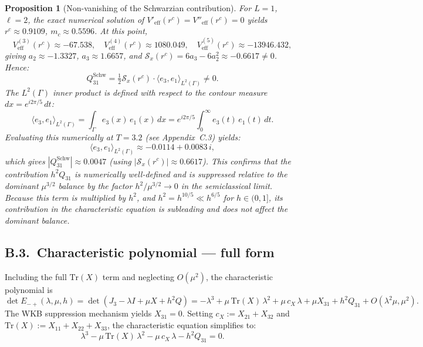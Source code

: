 \documentclass[12pt,a4paper]{amsart}
\newtheorem{proposition}[theorem]{Proposition}
\theoremstyle{remark}
\begin{document}
\begin{proposition}[Non-vanishing of the Schwarzian contribution]
For $L=1$, $\ell=2$, the exact numerical solution of
$V'_{\mathrm{eff}}(r^c) = V''_{\mathrm{eff}}(r^c) = 0$ yields $r^c \approx 0.9109$,
$m_c \approx 0.5596$. At this point,
\[
  V^{(3)}_{\mathrm{eff}}(r^c) \approx -67.538,\quad
  V^{(4)}_{\mathrm{eff}}(r^c) \approx 1080.049,\quad
  V^{(5)}_{\mathrm{eff}}(r^c) \approx -13946.432,
\]
giving $a_2 \approx -1.3327$, $a_3 \approx 1.6657$, and
$\mathcal{S}_x(r^c) = 6a_3 - 6a_2^2 \approx -0.6617 \neq 0$.
Hence:
\[
  Q^{\mathrm{Schw}}_{31} = \tfrac{1}{2}\mathcal{S}_x(r^c)\cdot\langle e_3,e_1\rangle_{L^2(\Gamma)} \neq 0.
\]
The $L^2(\Gamma)$ inner product is defined with respect to the contour measure $dx = e^{i2\pi/5}\,dt$:
\[
  \langle e_3, e_1\rangle_{L^2(\Gamma)}
  = \int_\Gamma e_3(x)\,e_1(x)\,dx
  = e^{i2\pi/5}\int_0^\infty e_3(t)\,e_1(t)\,dt.
\]
Evaluating this numerically at $T=3.2$ (see Appendix~C.3) yields:
\[
  \langle e_3, e_1\rangle_{L^2(\Gamma)} \approx -0.0114 + 0.0083\,i,
\]
which gives $|Q^{\mathrm{Schw}}_{31}| \approx 0.0047$ (using $|\mathcal{S}_x(r^c)|\approx 0.6617$).
This confirms that the contribution $h^2 Q_{31}$ is numerically well-defined and
is suppressed relative to the dominant $\mu^{3/2}$ balance by the factor
$h^2/\mu^{3/2} \to 0$ in the semiclassical limit.
Because this term is multiplied by $h^2$, and $h^2 = h^{10/5} \ll h^{6/5}$
for $h \in (0,1]$, its contribution in the characteristic equation is subleading
and does not affect the dominant balance.
\end{proposition}

\subsection*{B.3.~Characteristic polynomial --- full form}

Including the full $\mathrm{Tr}(X)$ term and neglecting $O(\mu^2)$, the characteristic
polynomial is
\begin{equation}
\label{eq:charpoly}
  \det E_{-+}(\lambda,\mu,h)
  = \det(J_3 - \lambda I + \mu X + h^2 Q)
  = -\lambda^3 + \mu\,\mathrm{Tr}(X)\,\lambda^2
    + \mu\,c_X\,\lambda
    + \mu X_{31} + h^2 Q_{31} + O(\lambda^2\mu,\mu^2).
\end{equation}
The WKB suppression mechanism yields $X_{31}=0$. Setting $c_X := X_{21}+X_{32}$ and $\mathrm{Tr}(X) := X_{11}+X_{22}+X_{33}$, the characteristic equation
simplifies to:
\begin{equation}
\label{eq:charpoly2}
  \lambda^3 - \mu\,\mathrm{Tr}(X)\,\lambda^2 - \mu\,c_X\,\lambda - h^2 Q_{31} = 0.
\end{equation}
\end{document}
